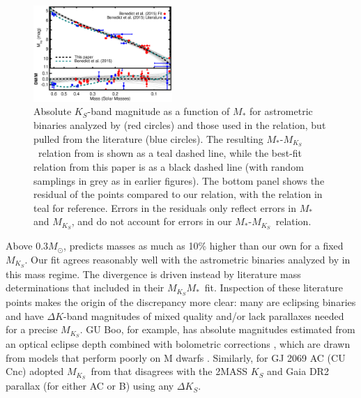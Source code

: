 \documentclass[twocolumn]{aastex62}
\newcommand{\mks}{$M_{K_S}$}
\newcommand{\mmk}{$M_{K_S}$\textendash$M_*$}
\begin{document}
\begin{figure}[htb]
\begin{center}
\includegraphics[width=0.47\textwidth]{Benedict_comp.eps}
\caption{Absolute $K_S$-band magnitude as a function of $M_*$ for astrometric binaries analyzed by \citet{Benedict2016} (red circles) and those used in the \citet{Benedict2016} relation, but pulled from the literature (blue circles). The resulting $M_*$-\mks\ relation from \citet{Benedict2016} is shown as a teal dashed line, while the best-fit relation from this paper is as a black dashed line (with random samplings in grey as in earlier figures). The bottom panel shows the residual of the \citet{Benedict2016} points compared to our relation, with the \citet{Benedict2016} relation in teal for reference. Errors in the residuals only reflect errors in $M_*$ and \mks, and do not account for errors in our $M_*$-\mks\ relation. }
\label{fig:benedict}
\end{center}
\end{figure}

 Above 0.3$M_\odot$, \citet{Benedict2016} predicts masses as much as 10\% higher than our own for a fixed \mks. Our fit agrees reasonably well with the astrometric binaries analyzed by \citet{Benedict2016} in this mass regime. The divergence is driven instead by literature mass determinations that \citet{Benedict2016} included in their \mmk\ fit. Inspection of these literature points makes the origin of the discrepancy more clear: many are eclipsing binaries and have $\Delta K$-band magnitudes of mixed quality and/or lack parallaxes needed for a precise \mks. GU Boo, for example, has absolute magnitudes estimated from an optical eclipse depth combined with bolometric corrections \citep{Lopez2005}, which are drawn from models that perform poorly on M dwarfs \citep{1998A&AS..130...65L,Hauschildt1999}. Similarly, for GJ 2069 AC (CU Cnc) \citet{Benedict2016} adopted \mks\ from \citet{Ribas2003} that disagrees with the 2MASS $K_S$ and Gaia DR2 parallax (for either AC or B) using any $\Delta K_S$. 
 
\end{document}
